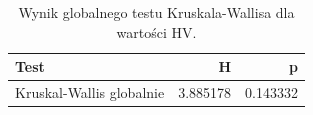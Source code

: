 \begin{table}
\caption{Wynik globalnego testu Kruskala-Wallisa dla wartości HV.}
\label{tab:kruskal_global}
\begin{tabular}{lrr}
\toprule
Test & H & p \\
\midrule
Kruskal-Wallis globalnie & 3.885178 & 0.143332 \\
\bottomrule
\end{tabular}
\end{table}
